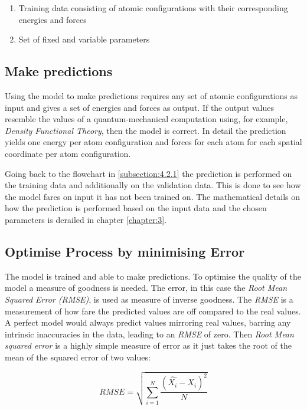  \begin{enumerate}
 	\item Training data consisting of atomic configurations with their corresponding energies and forces 
	\item Set of fixed and variable parameters 
\end{enumerate}


\subsection{Make predictions}
\label{subsection:4.2.5}

Using the model to make predictions requires any set of atomic configurations as input and gives a set of energies and forces as output. If the output values resemble the values of a quantum-mechanical computation using, for example, \textit{Density Functional Theory}, then the model is correct. In detail the prediction yields one energy per atom configuration and forces for each atom for each spatial coordinate per atom configuration.

Going back to the flowchart in  \ref{subsection:4.2.1} the prediction is performed on the training data and additionally on the validation data. This is done to see how the model fares on input it has not been trained on. The mathematical details on how the prediction is performed based on the input data and the chosen parameters is derailed in chapter \ref{chapter:3}. 

\subsection{Optimise Process by minimising Error}
\label{subsection:4.2.6}
The model is trained and able to make predictions. To optimise the quality of the model a measure of goodness is needed. The error, in this case the \textit{Root Mean Squared Error (RMSE)}, is used as measure of inverse goodness. The \textit{RMSE} is a measurement of how fare the predicted values are off compared to the real values. A perfect model would always predict values mirroring real values, barring any intrinsic inaccuracies in the data, leading to an \textit{RMSE} of zero. Then \textit{Root Mean squared error} is a highly simple measure of error as it just takes the root of the mean of the squared error of two values: 

\begin{equation}
	\label{eq:RMSE}
		RMSE = \sqrt{
		\sum_{i=1}^{N}
		\frac
		{(\hat{X_i} - X_i)^2}
		{N}
}
\end{equation}

